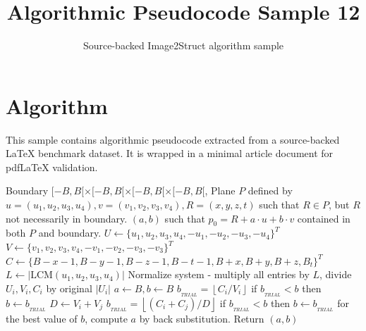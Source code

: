\documentclass[11pt]{article}
\title{Algorithmic Pseudocode Sample 12}
\author{Source-backed Image2Struct algorithm sample}
\date{}
\begin{document}
\maketitle
\section{Algorithm}
This sample contains algorithmic pseudocode extracted from a source-backed LaTeX benchmark dataset. It is wrapped in a minimal article document for pdfLaTeX validation.

\begin{algorithm}[htbp]
\caption{Source-backed algorithmic procedure}
\begin{algorithm}
[!ht]
\caption{Integer Linear Programming for 3d Subroutine of 4d Sieve}
\begin{algorithmic}
\Require
\State \hspace{5mm}Boundary $[-B,B[\times[-B,B[\times[-B,B[\times[-B,B[$,
\State Plane $P$ defined by $u=(u_1,u_2,u_3,u_4),v=(v_1,v_2,v_3,v_4),R=(x,y,z,t)$
\State \hspace{5mm} such that $R \in P$, but $R$ not necessarily in boundary.
\Ensure
\State \hspace{5mm}$(a,b)$ such that $p_0 = R + a\cdot u + b\cdot v$ contained in
both $P$ and boundary.
\Procedure{}{}
\vspace{1mm}
\State $U \gets \{ u_1,u_2,u_3,u_4,-u_1,-u_2,-u_3,-u_4 \}^T$
\State $V \gets \{ v_1,v_2,v_3,v_4,-v_1,-v_2,-v_3,-v_3 \}^T$
\State $C \gets \{ B-x-1,B-y-1,B-z-1,B-t-1,B+x,B+y,B+z,B_t \}^T$
\State $L \gets \lvert \text{LCM}\left(u_1,u_2,u_3,u_4\right) \rvert$
\State Normalize system - multiply all entries by $L$, divide $U_i,V_i,C_i$ by original $\lvert U_i \rvert$
\State $a \gets B, b \gets B$
\State $b_{_{TRIAL}} = \left\lfloor C_i / V_i \right\rfloor$
\State if $b_{_{TRIAL}} < b$ then $b \gets b_{_{TRIAL}}$
\Else
{}
\State $D \gets V_i + V_j$
\State $b_{_{TRIAL}} = \left\lfloor \left(C_i + C_j\right)/D \right\rfloor$
\State if $b_{_{TRIAL}} < b$ then $b \gets b_{_{TRIAL}}$
\EndIf
\EndIf
\EndIf
\EndFor
\State for the best value of $b$, compute $a$ by back substitution.
\State Return $(a,b)$
\State\EndProcedure
\end{algorithmic}\end{algorithm}
\end{algorithm}
\end{document}
